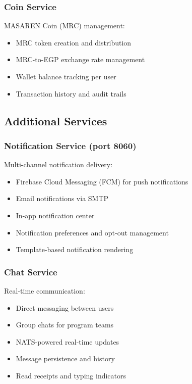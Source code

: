 \documentclass[11pt,a4paper]{article}
\begin{document}
\subsubsection{Coin Service}

MASAREN Coin (MRC) management:
\begin{itemize}
  \item MRC token creation and distribution
  \item MRC-to-EGP exchange rate management
  \item Wallet balance tracking per user
  \item Transaction history and audit trails
\end{itemize}

\subsection{Additional Services}

\subsubsection{Notification Service (port 8060)}

Multi-channel notification delivery:
\begin{itemize}
  \item Firebase Cloud Messaging (FCM) for push notifications
  \item Email notifications via SMTP
  \item In-app notification center
  \item Notification preferences and opt-out management
  \item Template-based notification rendering
\end{itemize}

\subsubsection{Chat Service}

Real-time communication:
\begin{itemize}
  \item Direct messaging between users
  \item Group chats for program teams
  \item NATS-powered real-time updates
  \item Message persistence and history
  \item Read receipts and typing indicators
\end{itemize}
\end{document}
